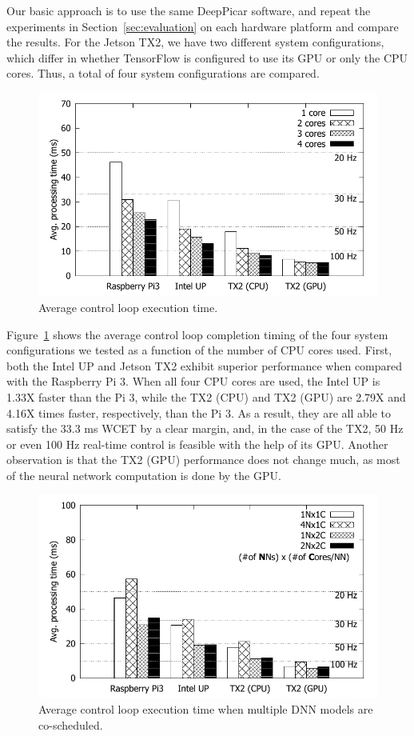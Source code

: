 Our basic approach is to use the same DeepPicar software, and repeat
the experiments in Section~\ref{sec:evaluation} on each hardware
platform and compare the results. 
For the Jetson TX2, we have two different system configurations,
which differ in whether TensorFlow is configured to use its GPU or
only the CPU cores. Thus, a total of four system configurations are
compared.

\begin{figure}[h]
  \centering
  \includegraphics[width=.45\textwidth]{figs/compare_core}
  \caption{Average control loop execution time.} 
  \label{fig:sys_core}
\end{figure}

Figure~\ref{fig:sys_core} shows the average control loop completion
timing of the four system configurations we tested as a function of
the number of CPU cores used.
First, both the Intel UP and Jetson TX2 exhibit superior performance when
compared with the Raspberry Pi 3. 
When all four CPU cores are used, the Intel UP is 1.33X faster than
the Pi 3, while the TX2 (CPU) and TX2 (GPU) are 2.79X and 4.16X times faster,
respectively, than the Pi 3. 
As a result, they are all able to satisfy the 33.3 ms 
WCET by a clear margin,
and, in the case of the TX2, 50 Hz or even 100 Hz real-time control is
feasible with the help of its GPU. Another observation is that the TX2
(GPU) performance does not change much, as most of the neural network 
computation is done by the GPU.

\begin{figure}[h]
  \centering
  \includegraphics[width=.45\textwidth]{figs/compare_model}
  \caption{Average control loop execution time when multiple DNN
    models are co-scheduled. }
  \label{fig:sys_model}
\end{figure}

